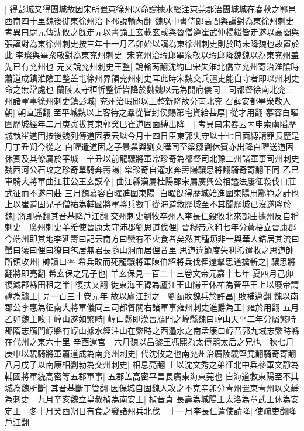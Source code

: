 |{
	得彭城又得團城故因宋所置東徐州以命讜據水經注東莞郡治團城城在春秋之鄆邑西南四十里魏後徙東徐州治下邳說輸芮翻}
魏以中書侍郎高閭與讜對為東徐州刺史|{
	考異曰尉元傳沈攸之旣走元以書諭王玄載玄載與魯僧遵崔武仲楊繼皆走遂以高閭與張讜對為東徐州刺史按三年十一月乙卯始以讜為東徐州刺史則於時未降魏也故置於此}
李璨與畢衆敬對為東兖州刺史|{
	宋兖州治瑕邱畢衆敬以瑕邱降魏魏以為東兖州盖先已有兖州也}
元又說兖州刺史王整|{
	說輸芮翻沈約曰宋失淮北僑立兖州寄治淮隂時蕭道成鎮淮隂王整盖屯徐州界領兖州刺史耳此時宋魏交兵疆吏能自守者即以州刺史命之無常處也}
蘭陵太守桓忻整忻皆降於魏魏以元為開府儀同三司都督徐南北兖三州諸軍事徐州刺史鎮彭城|{
	兖州治瑕邱以王整新降故分南北兖}
召薛安都畢衆敬入朝|{
	朝直遥翻}
至平城魏以上客待之羣從皆封侯賜第宅資給甚厚|{
	從才用翻}
慕容白曜圍歷城經年二月庚寅拔其東郭癸巳崔道固面縛出降　|{
	考異曰宋畧云丙申索虜䧟歷城執崔道固按後魏列傳道固表云以今月十四日臣東郭失守以十七日面縛請罪長歷是月丁丑朔今從之}
白曜遣道固之子景業與劉文曄同至梁鄒劉休賓亦出降白曜送道固休賓及其僚属於平城　辛丑以前龍驤將軍常珍奇為都督司北豫二州諸軍事司州刺史魏西河公石攻之珍奇單騎奔壽陽|{
	常珍奇自灌水奔壽陽驤思將翻騎奇寄翻下同}
乙巳車騎大將軍曲江莊公王玄謨卒|{
	曲江縣漢屬桂陽郡宋屬廣興公相謚法屢征殺伐曰莊武征而不遂曰莊}
三月魏慕容白曜進圍東陽|{
	白曜旣得歷城始進圍東陽用酈範之計也}
上以崔道固兄子僧祐為輔國將軍將兵數千從海道救歷城至不其聞歷城已沒遂降於魏|{
	將即亮翻其音基降戶江翻}
交州刺史劉牧卒州人李長仁殺牧北來部曲據州反自稱刺史　廣州刺史羊希使晉康太守沛郡劉思道伐俚|{
	晉穆帝永和七年分蒼梧立晉康郡今端州即其地李延壽曰記云南方曰蠻有不火食者矣然其種類非一與華人錯居其流曰蜑曰獽曰俚曰獠曰㐌居無君長隨山洞而居俚音里}
思道違節度失利希遣收之思道帥所領攻州|{
	帥讀曰率}
希兵敗而死龍驤將軍陳伯紹將兵伐俚還擊思道擒斬之|{
	驤思將翻將即亮翻}
希玄保之兄子也|{
	羊玄保見一百二十三卷文帝元嘉十七年}
夏四月己卯復減郡縣田租之半|{
	復扶又翻}
徙東海王禕為廬江王山陽王休祐為晉平王上以廢帝謂禕為驢王|{
	見一百三十卷元年}
故以廬江封之　劉勔敗魏兵於許昌|{
	敗補邁翻}
魏以南郡公李惠為征南大將軍儀同三司都督關右諸軍事雍州刺史進爵為王|{
	雍於用翻}
五月乙卯魏主畋于崞山遂如繁畤|{
	崞山縣即漢晉鴈門之崞縣魏曰崞山天平二年分屬繁畤郡隋志鴈門崞縣有崞山據水經注山在繁畤之西灅水之南孟康曰崞音郭九域志繁畤縣在代州之東六十里}
辛酉還宫　六月魏以昌黎王馮熙為太傳熙太后之兄也　秋七月庚申以驍騎將軍蕭道成為南兖州刺史|{
	代沈攸之也南兖州治廣陵驍堅堯翻騎奇寄翻}
八月戊子以南康相劉勃為交州刺史|{
	相息亮翻}
上以沈文秀之弟征北中兵參軍文靜為輔國將軍統高密等五郡軍事|{
	五郡盖高密平昌長廣東海東莞也}
自海道救東陽至不其城為魏所斷|{
	其音基斷丁管翻}
因保城自固魏人攻之不克辛卯分青州置東青州以文靜為刺史　九月辛亥魏立皇叔楨為南安王|{
	楨音貞}
長壽為城陽王太洛為章武王休為安定王　冬十月癸酉朔日有食之發諸州兵北伐　十一月李長仁遣使請降|{
	使疏吏翻降戶江翻}
